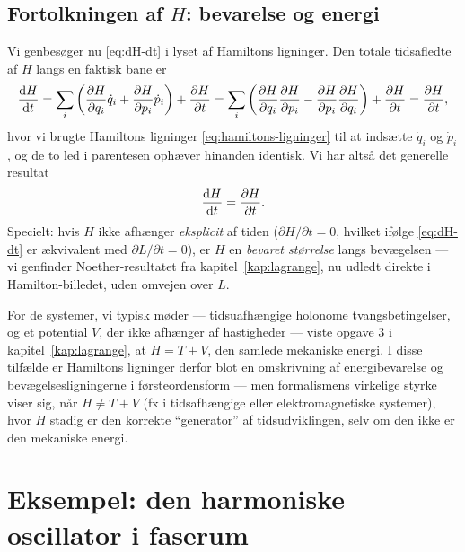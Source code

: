 \subsection{Fortolkningen af $H$: bevarelse og energi}

Vi genbesøger nu \eqref{eq:dH-dt} i lyset af Hamiltons ligninger. Den
totale tidsafledte af $H$ langs en faktisk bane er
\begin{equation}
  \dv{H}{t} = \sum_i\left(\pdv{H}{q_i}\dot q_i + \pdv{H}{p_i}\dot p_i\right) + \pdv{H}{t}
  = \sum_i\left(\pdv{H}{q_i}\pdv{H}{p_i} - \pdv{H}{p_i}\pdv{H}{q_i}\right) + \pdv{H}{t}
  = \pdv{H}{t},
\end{equation}
hvor vi brugte Hamiltons ligninger \eqref{eq:hamiltons-ligninger} til
at indsætte $\dot q_i$ og $\dot p_i$, og de to led i parentesen
ophæver hinanden identisk. Vi har altså det generelle resultat
\begin{equation}
  \dv{H}{t} = \pdv{H}{t}.
  \label{eq:dHdt-generel}
\end{equation}
Specielt: hvis $H$ ikke afhænger \emph{eksplicit} af tiden
($\partial H/\partial t=0$, hvilket ifølge \eqref{eq:dH-dt} er
ækvivalent med $\partial L/\partial t=0$), er $H$ en \emph{bevaret
størrelse} langs bevægelsen — vi genfinder Noether-resultatet fra
kapitel~\ref{kap:lagrange}, nu udledt direkte i Hamilton-billedet, uden
omvejen over $L$.

For de systemer, vi typisk møder — tidsuafhængige holonome
tvangsbetingelser, og et potential $V$, der ikke afhænger af
hastigheder — viste opgave 3 i kapitel~\ref{kap:lagrange}, at
$H=T+V$, den samlede mekaniske energi. I disse tilfælde er Hamiltons
ligninger derfor blot en omskrivning af energibevarelse og
bevægelsesligningerne i førsteordensform — men formalismens virkelige
styrke viser sig, når $H\neq T+V$ (fx i tidsafhængige eller
elektromagnetiske systemer), hvor $H$ stadig er den korrekte
``generator'' af tidsudviklingen, selv om den ikke er den mekaniske
energi.

\section{Eksempel: den harmoniske oscillator i faserum}


